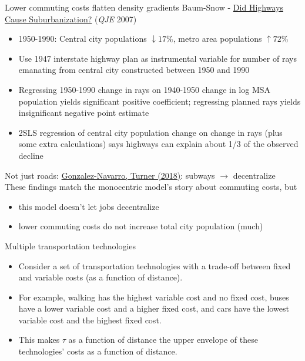 \documentclass[11pt,notes=hide,aspectratio=169]{beamer}
\begin{document}
\begin{frame}{Lower commuting costs flatten density gradients}
Baum-Snow - \href{https://doi.org/10.1162/qjec.122.2.775}{Did Highways Cause Suburbanization?} (\textit{QJE} 2007)
\begin{itemize}
\item 1950-1990: Central city populations $\downarrow 17\%$, metro area populations $\uparrow 72\%$
\item Use 1947 interstate highway plan as instrumental variable for number of rays emanating from central city constructed between 1950 and 1990
\item Regressing 1950-1990 change in rays on 1940-1950 change in log MSA population yields significant positive coefficient; regressing planned rays yields insignificant negative point estimate
\item 2SLS regression of central city population change on change in rays (plus some extra calculations) says highways can explain about 1/3 of the observed decline
\end{itemize}
Not just roads: \href{https://doi.org/10.1016/j.jue.2018.09.002}{Gonzalez-Navarro, Turner (2018)}: subways $\to$ decentralize\\
These findings match the monocentric model's story about commuting costs, but
\begin{itemize}
\item this model doesn't let jobs decentralize
\item lower commuting costs do not increase total city population (much)
\end{itemize}
\end{frame}
\begin{frame}{Multiple transportation technologies}
\begin{itemize}
\item Consider a set of transportation technologies with a trade-off between fixed and variable costs (as a function of distance).
\item For example, walking has the highest variable cost and no fixed cost,
buses have a lower variable cost and a higher fixed cost, and cars
have the lowest variable cost and the highest fixed cost.
\item This makes $\tau$ as a function of distance the upper envelope of these technologies' costs as a function of distance.
\end{itemize}
\end{frame}
\end{document}
